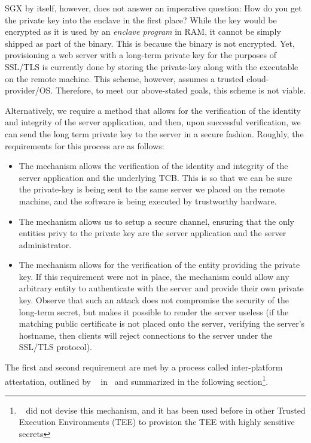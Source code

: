 \documentclass[../main.tex]{subfiles}
\begin{document}
SGX by itself, however, does not answer an imperative question: How do
you get the private key into the enclave in the first place? While the
key would be encrypted as it is used by an \textit{enclave program} in
RAM, it cannot be simply shipped as part of the binary. This is
because the binary is not encrypted. Yet, provisioning a web server
with a long-term private key for the purposes of SSL/TLS is currently
done by storing the private-key along with the executable on the
remote machine. This scheme, however, assumes a trusted
cloud-provider/OS. Therefore, to meet our above-stated goals,
this scheme is not viable.

Alternatively, we require a method that allows for the verification of
the identity and integrity of the server application, and then, upon
successful verification, we can send the long term private key to the
server in a secure fashion. Roughly, the requirements for this process
are as follows:
\begin{itemize}
  \item The mechanism allows the verification of the identity and
    integrity of the server application and the underlying TCB.  This is
    so that we can be sure the private-key is being sent to the same
    server we placed on the remote machine, and the software is being
    executed by trustworthy hardware.
  \item The mechanism allows us to setup a secure channel, ensuring that
    the only entities privy to the private key are the server
    application and the server administrator.
  \item The mechanism allows for the verification of the entity
    providing the private key. If this requirement were not in place,
    the mechanism could allow any arbitrary entity to authenticate with
    the server and provide their own private key. Observe that such an
    attack does not compromise the security of the long-term secret, but
    makes it possible to render the server useless (if the matching
    public certificate is not placed onto the server, verifying the
    server's hostname, then clients will reject connections to the
    server under the SSL/TLS protocol). %
\end{itemize}
The first and second requirement are met by a process called
inter-platform attestation, outlined by \Intel~
in~\cite{IntelCorporation2010} and summarized in the following
section\footnote{\Intel~ did not devise this mechanism, and it has been
used before in other Trusted Execution Environments (TEE) to
provision the TEE with highly sensitive secrets}.
\end{document}
